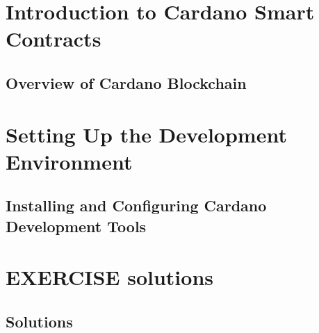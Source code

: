 \usepackage{lipsum}
\usepackage[automake,toc]{glossaries}
\usepackage{caption}
\usepackage{listings}
\usepackage{xcolor}
\usepackage{filecontents}
\makeglossaries




\coverpage{\TITLE}{\SUBTITLE}{\AUTHOR}{\DATE}{\SUBJECT}
\newpage
\tableofcontents

\part{Introduction to Cardano Smart Contracts}
\newpage
\chapter{Overview of Cardano Blockchain} \label{ch:overview}

\part{Setting Up the Development Environment}
\newpage
\chapter{Installing and Configuring Cardano Development Tools} \label{ch:setup}



\newpage
\part{EXERCISE solutions}
\chapter{Solutions}




\printglossary[title={Glossary}, type=main]

